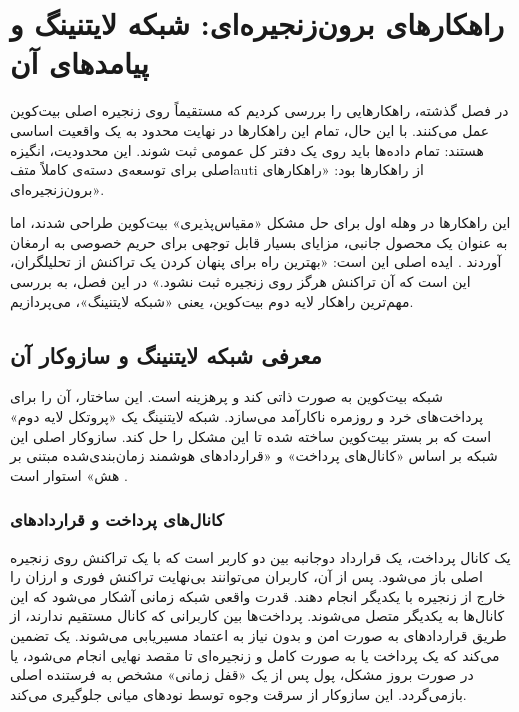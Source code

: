 \chapter{راهکارهای برون‌زنجیره‌ای: شبکه لایتنینگ و پیامدهای آن}
\label{chap:offchain_solutions}

در فصل گذشته، راهکارهایی را بررسی کردیم که مستقیماً روی زنجیره اصلی بیت‌کوین عمل می‌کنند. با این حال، تمام این راهکارها در نهایت محدود به یک واقعیت اساسی هستند: تمام داده‌ها باید روی یک دفتر کل عمومی ثبت شوند. این محدودیت، انگیزه اصلی برای توسعه‌ی دسته‌ی کاملاً متفauti از راهکارها بود: «راهکارهای برون‌زنجیره‌ای».

این راهکارها در وهله اول برای حل مشکل «مقیاس‌پذیری» بیت‌کوین طراحی شدند، اما به عنوان یک محصول جانبی، مزایای بسیار قابل توجهی برای حریم خصوصی به ارمغان آوردند \cite{decker_sok}. ایده اصلی این است: «بهترین راه برای پنهان کردن یک تراکنش از تحلیلگران، این است که آن تراکنش هرگز روی زنجیره ثبت نشود.» در این فصل، به بررسی مهم‌ترین راهکار لایه دوم بیت‌کوین، یعنی «شبکه لایتنینگ»، می‌پردازیم.

\section{معرفی شبکه لایتنینگ و سازوکار آن}

شبکه بیت‌کوین به صورت ذاتی کند و پرهزینه است. این ساختار، آن را برای پرداخت‌های خرد و روزمره ناکارآمد می‌سازد. شبکه لایتنینگ یک «پروتکل لایه دوم» است که بر بستر بیت‌کوین ساخته شده تا این مشکل را حل کند. سازوکار اصلی این شبکه بر اساس «کانال‌های پرداخت» و «قراردادهای هوشمند زمان‌بندی‌شده مبتنی بر هش» استوار است \cite{antonopoulos_mastering}.

\subsection{کانال‌های پرداخت و قراردادهای }
یک کانال پرداخت، یک قرارداد دوجانبه بین دو کاربر است که با یک تراکنش روی زنجیره اصلی باز می‌شود. پس از آن، کاربران می‌توانند بی‌نهایت تراکنش فوری و ارزان را خارج از زنجیره با یکدیگر انجام دهند. قدرت واقعی شبکه زمانی آشکار می‌شود که این کانال‌ها به یکدیگر متصل می‌شوند. پرداخت‌ها بین کاربرانی که کانال مستقیم ندارند، از طریق قراردادهای  به صورت امن و بدون نیاز به اعتماد مسیریابی می‌شوند.
یک  تضمین می‌کند که یک پرداخت یا به صورت کامل و زنجیره‌ای تا مقصد نهایی انجام می‌شود، یا در صورت بروز مشکل، پول پس از یک «قفل زمانی» مشخص به فرستنده اصلی بازمی‌گردد. این سازوکار از سرقت وجوه توسط نودهای میانی جلوگیری می‌کند.

